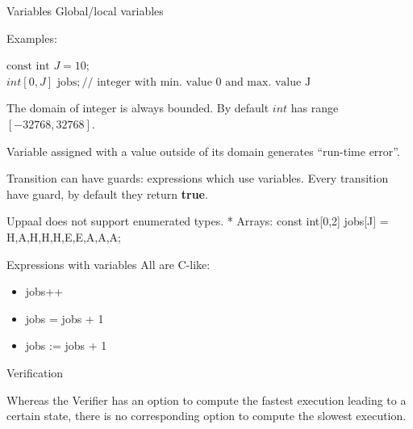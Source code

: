 \documentclass{beamer}
\begin{document}
\begin{frame}{Variables}
	Global/local variables\newline
	
	Examples:\newline
	
	$\text{const int } J = 10;$\\
	$ int[0,J] \text{ jobs}; // \text{ integer with min. value 0 and max. value J}$\newline
	
	The domain of integer is always bounded. By default $int$ has range $[-32768, 32768]$.\newline
	
	Variable assigned with a value outside of its domain generates ``run-time error''.\newline
	
	Transition can have guards: expressions which use variables. Every transition have guard, by default they return \textbf{true}.\newline
	
	Uppaal does not support enumerated types.\newline
	*
	Arrays: const int[0,2] jobs[J] = {H,A,H,H,H,E,E,A,A,A};
\end{frame}

\begin{frame}{Expressions with variables}
	All are C-like:
	\begin{itemize}
		\item jobs++
		\item jobs = jobs + 1
		\item jobs := jobs + 1
	\end{itemize}
	
\end{frame}

\begin{frame}{Verification}
	
	Whereas the Verifier has an option to compute the fastest execution leading to
	a certain state, there is no corresponding option to compute the slowest execution.
\end{frame}
\end{document}
